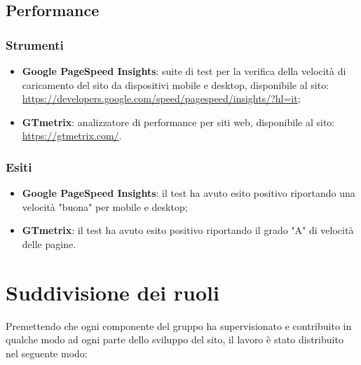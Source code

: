 \documentclass[12pt]{article}
\begin{document}
	\subsection{Performance}
	
	\subsubsection{Strumenti}
	
	\begin{itemize}
		\item \textbf{Google PageSpeed Insights}: suite di test per la verifica della velocità di caricamento del sito da dispositivi mobile e desktop, disponibile al sito:
		\\ \url{https://developers.google.com/speed/pagespeed/insights/?hl=it};
		
		\item \textbf{GTmetrix}: analizzatore di performance per siti web, disponibile al sito:
		\\ \url{https://gtmetrix.com/}.
	\end{itemize}
	
	\subsubsection{Esiti}
	
	\begin{itemize}
		\item \textbf{Google PageSpeed Insights}: il test ha avuto esito positivo riportando una velocità "buona" per mobile e desktop;
		
		\item \textbf{GTmetrix}: il test ha avuto esito positivo riportando il grado "A" di velocità delle pagine. 
	\end{itemize}

\newpage
\appendix

	\section{Suddivisione dei ruoli}
	
	Premettendo che ogni componente del gruppo ha supervisionato e contribuito in qualche modo ad ogni parte dello sviluppo del sito, il lavoro è stato distribuito nel seguente modo:
	
\end{document}
